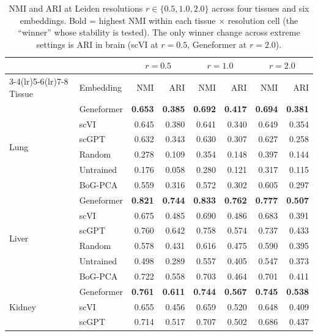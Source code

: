 \documentclass[9pt,lineno]{elife}
\begin{document}
\begin{table}[h!]
\centering
\caption{NMI and ARI at Leiden resolutions $r \in \{0.5, 1.0, 2.0\}$ across four tissues and six embeddings. Bold = highest NMI within each tissue $\times$ resolution cell (the ``winner'' whose stability is tested). The only winner change across extreme settings is ARI in brain (scVI at $r=0.5$, Geneformer at $r=2.0$).}
\label{tab:app_leiden}
\scriptsize
\begin{tabular}{@{}ll rr rr rr@{}}
\toprule
 & & \multicolumn{2}{c}{$r = 0.5$} & \multicolumn{2}{c}{$r = 1.0$} & \multicolumn{2}{c}{$r = 2.0$} \\
\cmidrule(lr){3-4}\cmidrule(lr){5-6}\cmidrule(lr){7-8}
Tissue & Embedding & NMI & ARI & NMI & ARI & NMI & ARI \\
\midrule
\multirow{6}{*}{Lung}
 & Geneformer & \textbf{0.653} & \textbf{0.385} & \textbf{0.692} & \textbf{0.417} & \textbf{0.694} & \textbf{0.381} \\
 & scVI       & 0.645 & 0.380 & 0.641 & 0.340 & 0.649 & 0.354 \\
 & scGPT      & 0.632 & 0.343 & 0.630 & 0.307 & 0.627 & 0.258 \\
 & Random     & 0.278 & 0.109 & 0.354 & 0.148 & 0.397 & 0.144 \\
 & Untrained  & 0.176 & 0.058 & 0.280 & 0.121 & 0.317 & 0.115 \\
 & BoG-PCA    & 0.559 & 0.316 & 0.572 & 0.302 & 0.605 & 0.297 \\
\midrule
\multirow{6}{*}{Liver}
 & Geneformer & \textbf{0.821} & \textbf{0.744} & \textbf{0.833} & \textbf{0.762} & \textbf{0.777} & \textbf{0.507} \\
 & scVI       & 0.675 & 0.485 & 0.690 & 0.486 & 0.683 & 0.391 \\
 & scGPT      & 0.760 & 0.642 & 0.758 & 0.574 & 0.737 & 0.433 \\
 & Random     & 0.578 & 0.431 & 0.616 & 0.475 & 0.590 & 0.395 \\
 & Untrained  & 0.498 & 0.289 & 0.557 & 0.405 & 0.547 & 0.373 \\
 & BoG-PCA    & 0.722 & 0.558 & 0.703 & 0.464 & 0.701 & 0.411 \\
\midrule
\multirow{6}{*}{Kidney}
 & Geneformer & \textbf{0.761} & \textbf{0.611} & \textbf{0.744} & \textbf{0.567} & \textbf{0.745} & \textbf{0.538} \\
 & scVI       & 0.655 & 0.456 & 0.659 & 0.520 & 0.648 & 0.409 \\
 & scGPT      & 0.714 & 0.517 & 0.707 & 0.502 & 0.686 & 0.437 \\

\end{tabular}
\end{table}
\end{document}
